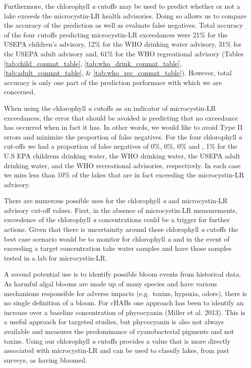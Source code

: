 \documentclass[11pt,]{article}
\begin{document}
Furthermore, the chlorophyll \emph{a} cutoffs may be used to predict
whether or not a lake exceeds the microcystin-LR health advisories.
Doing so allows us to compare the accuracy of the prediction as well as
evaluate false negatives. Total accuracy of the four cutoffs predicting
microcystin-LR exceedances were 21\% for the USEPA children's advisory,
12\% for the WHO drinking water advisory, 31\% for the USEPA adult
advisory and, 61\% for the WHO regreational advisory (Tables
\ref{tab:child_conmat_table}, \ref{tab:who_drink_conmat_table},
\ref{tab:adult_conmat_table}, \& \ref{tab:who_rec_conmat_table}).
However, total accuracy is only one part of the prediction performace
with which we are concerned.

When using the chlorophyll \emph{a} cutoffs as an indicator of
microcystin-LR exceedances, the error that should be avoided is
predicting that no exceedance has occurred when in fact it has. In other
words, we would like to avoid Type II errors and minimize the proportion
of false negatives. For the four chlorophyll \emph{a} cut-offs we had a
proportion of false negatives of 0\%, 0\%, 0\% and , 1\% for the U.S EPA
childrens drinking water, the WHO drinking water, the USEPA adult
drinking water, and the WHO recreational advisories, respectively. In
each case we miss less than 10\% of the lakes that are in fact exceeding
the microcystin-LR advisory.

There are numerous possible uses for the chlorophyll \emph{a} and
microcystin-LR advisory cut-off values. First, in the absence of
microcystin-LR measurements, exceedence of the chlorophyll \emph{a}
concentrations could be a trigger for further actions. Given that there
is uncertainity around these chlorophyll \emph{a} cutoffs the best case
scenario would be to monitor for chlorophyll \emph{a} and in the event
of exceeding a target concentration take water samples and have those
samples tested in a lab for microcystin-LR.

A second potential use is to identify possible bloom events from
historical data. As harmful algal blooms are made up of many species and
have various mechanisms responsible for adverse impacts (e.g.~toxins,
hypoxia, odors), there is no single definition of a bloom. For cHABs one
approach has been to identify an increase over a baseline concentration
of phycocyanin (Miller et al. 2013). This is a useful approach for
targeted studies, but phycocyanin is also not always available and
measures the predominance of cyanobacterial pigments and not toxins.
Using our chlorophyll \emph{a} cutoffs provides a value that is more
directly associated with microcystin-LR and can be used to classify
lakes, from past surveys, as having bloomed.
\end{document}
